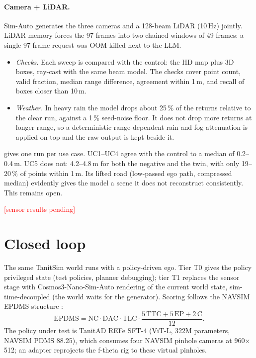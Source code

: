 \documentclass[10pt,a4paper]{article}
\newcommand{\todo}[1]{\textcolor{red}{[#1]}}
\providecommand{\ResultsSensors}{\todo{sensor results pending}}
\begin{document}
\paragraph{Camera + LiDAR.} Sim-Auto generates the three cameras and a 128-beam LiDAR (10\,Hz) jointly. LiDAR
memory forces the 97 frames into two chained windows of 49 frames: a single 97-frame request was OOM-killed next
to the LLM.
\begin{itemize}[leftmargin=1.4em,itemsep=0pt]
\item \emph{Checks.} Each sweep is compared with the control: the HD map plus 3D boxes, ray-cast with the same
  beam model. The checks cover point count, valid fraction, median range difference, agreement within 1\,m, and
  recall of boxes closer than 10\,m.
\item \emph{Weather.} In heavy rain the model drops about 25\,\% of the returns relative to the clear run,
  against a 1\,\% seed-noise floor. It does not drop more returns at longer range, so a deterministic
  range-dependent rain and fog attenuation is applied on top and the raw output is kept beside it.
\end{itemize}
 gives one run per use case. UC1--UC4 agree with the control to a median of 0.2--0.4\,m.
UC5 does not: 4.2--4.8\,m for both the negative and the twin, with only 19--20\,\% of points within 1\,m. Its
lifted road (low-passed ego path, compressed median) evidently gives the model a scene it does not reconstruct
consistently. This remains open.

\ResultsSensors

\section{Closed loop}
The same TanitSim world runs with a policy-driven ego. Tier T0 gives the policy privileged state (test
policies, planner debugging); tier T1 replaces the sensor stage with Cosmos3-Nano-Sim-Auto rendering of the
current world state, sim-time-decoupled (the world waits for the generator). Scoring follows the NAVSIM
EPDMS structure \cite{navsim}:
\begin{equation}
\text{EPDMS} = \text{NC}\cdot\text{DAC}\cdot\text{TLC}\cdot\frac{5\,\text{TTC} + 5\,\text{EP} + 2\,\text{C}}{12}.
\end{equation}
The policy under test is TanitAD REFe SFT-4 (ViT-L, 322M parameters, NAVSIM PDMS 88.25), which consumes four
NAVSIM pinhole cameras at 960$\times$512; an adapter reprojects the f-theta rig to these virtual pinholes.
\end{document}

